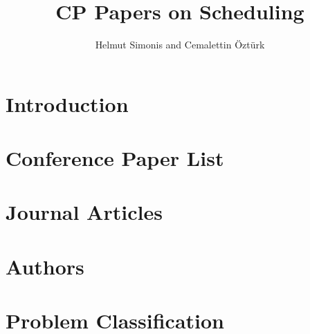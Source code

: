 \documentclass[a4paper]{article}
\title{CP Papers on Scheduling}
\author{Helmut Simonis and Cemalettin Öztürk}
\begin{document}

\maketitle
\section{Introduction}

\clearpage


\section{Conference Paper List}

\clearpage


\clearpage


\clearpage


\clearpage
\section{Journal Articles}




\clearpage


\clearpage


\clearpage
\section{Authors}




\clearpage
\section{Problem Classification}
\end{document}
